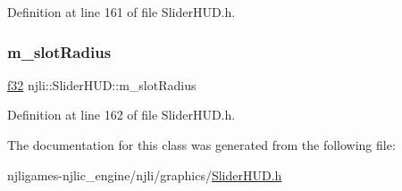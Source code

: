 Definition at line 161 of file Slider\+H\+U\+D.\+h.

\mbox{\label{classnjli_1_1_slider_h_u_d_a983798d2710f43d303b8b0d573cd041a}} 
\subsubsection{\texorpdfstring{m\+\_\+slot\+Radius}{m\_slotRadius}}
{\footnotesize\ttfamily \mbox{\hyperlink{_util_8h_a5f6906312a689f27d70e9d086649d3fd}{f32}} njli\+::\+Slider\+H\+U\+D\+::m\+\_\+slot\+Radius\hspace{0.3cm}{\ttfamily [private]}}



Definition at line 162 of file Slider\+H\+U\+D.\+h.



The documentation for this class was generated from the following file\+:\begin{DoxyCompactItemize}
\item 
njligames-\/njlic\+\_\+engine/njli/graphics/\mbox{\hyperlink{_slider_h_u_d_8h}{Slider\+H\+U\+D.\+h}}\end{DoxyCompactItemize}
